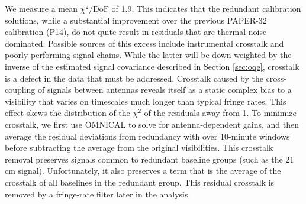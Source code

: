 \documentclass[twocolumn,numberedappendix]{emulateapj} \shorttitle{New Limits on the 21 cm Power Spectrum at $z=8.4$}
\begin{document}
We measure a mean $\chi^{2}/\text{DoF}$ of 1.9.  This
indicates that the redundant calibration solutions, while a substantial improvement
over the previous PAPER-32 calibration (P14), do not quite result in residuals that are thermal noise dominated.
Possible sources of this excess include instrumental crosstalk and poorly performing signal chains.
While the latter will be down-weighted by the inverse of the estimated signal covariance described
in Section \ref{sec:oqe}, crosstalk is a defect in the data that must be addressed.
Crosstalk caused by the cross-coupling of signals between antennas
reveals itself as a static complex bias to a
visibility that varies on timescales much longer than typical fringe rates.
This effect 
skews the distribution of the $\chi^2$ of the residuals away from 1.
To minimize crosstalk, we first use OMNICAL to solve for antenna-dependent gains,
and then average the residual deviations from redundancy with
over 10-minute windows before subtracting
the average from the original visibilities. This
crosstalk removal preserves signals common to redundant baseline groups (such as the 21 cm signal).
Unfortunately, it also preserves a term that is the average of the crosstalk of all baselines
in the redundant group.  This residual crosstalk is removed by a fringe-rate filter later
in the analysis.
\end{document}
